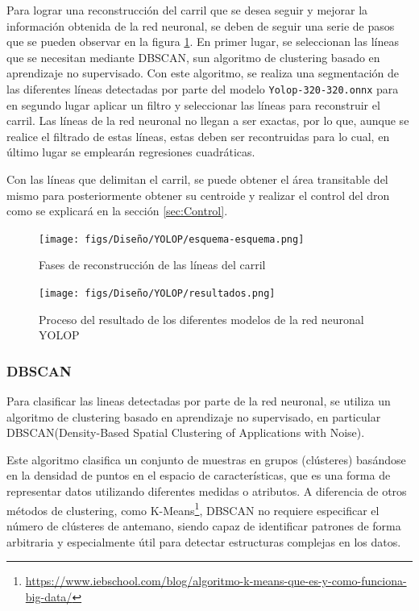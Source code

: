 Para lograr una reconstrucción del carril que se desea seguir y mejorar la información obtenida de la red neuronal, se deben de seguir una serie de pasos que se pueden observar 
en la figura \ref{Proceso}. En primer lugar, se seleccionan las líneas que se necesitan mediante DBSCAN, 
sun algoritmo de clustering basado en aprendizaje no supervisado. 
Con este algoritmo, se realiza una segmentación de las diferentes líneas detectadas por parte del modelo \texttt{Yolop-320-320.onnx} para en segundo lugar aplicar un filtro y seleccionar las líneas 
para reconstruir el carril. Las líneas de la red neuronal no llegan a ser exactas, por lo que, aunque se realice el filtrado de estas líneas, estas deben ser recontruidas para lo cual, en último lugar 
se emplearán regresiones cuadráticas.

Con las líneas que delimitan el carril, se puede obtener el área transitable del mismo para posteriormente obtener su centroide y realizar el control del dron como se explicará en la sección 
\ref{sec:Control}. \\

\begin{figure} [H]
  \begin{center}
    \texttt{[image: figs/Diseño/YOLOP/esquema-esquema.png]}
  \end{center}
  \caption{Fases de reconstrucción de las líneas del carril}
  \label{Proceso}
\end{figure}

\begin{figure} [H]
  \begin{center}
    \texttt{[image: figs/Diseño/YOLOP/resultados.png]}
  \end{center}
  \caption{Proceso del resultado de los diferentes modelos de la red neuronal YOLOP}
  \label{Proceso-YOLOP}
\end{figure}
\newpage
\subsubsection{DBSCAN}
\label{sec:DBSCAN}

Para clasificar las lineas detectadas por parte de la red neuronal, se utiliza un algoritmo de clustering basado en aprendizaje no supervisado, en particular
DBSCAN(Density-Based Spatial Clustering of Applications with Noise)\cite{ski_dbs}.

Este algoritmo clasifica un conjunto de muestras en grupos (clústeres) basándose en la densidad de puntos en el espacio de características, que es una forma de representar
datos utilizando diferentes medidas o atributos. A diferencia de otros métodos de clustering, como K-Means\footnote{\url{https://www.iebschool.com/blog/algoritmo-k-means-que-es-y-como-funciona-big-data/}}, 
DBSCAN no requiere especificar el número de clústeres de antemano, 
siendo capaz de identificar patrones de forma arbitraria y especialmente útil para detectar estructuras complejas en los datos. 

